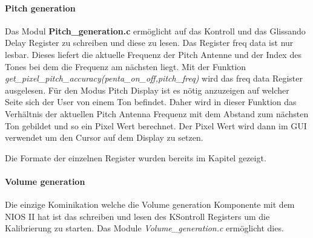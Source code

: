 \paragraph{Pitch generation}
Das Modul \textbf{Pitch\_generation.c} ermöglicht auf das Kontroll und das Glissando Delay Register zu schreiben und diese zu lesen. Das Register freq data ist nur lesbar. Dieses liefert die aktuelle Frequenz der Pitch Antenne und der Index des Tones bei dem die Frequenz am nächsten liegt. 
Mit der Funktion \textit{get\_pixel\_pitch\_accuracy(penta\_on\_off,pitch\_freq)} wird das freq data Register ausgelesen. Für den Modus Pitch Display ist es nötig anzuzeigen auf welcher Seite sich der User von einem Ton befindet. Daher wird in dieser Funktion das Verhältnis der aktuellen Pitch Antenna Frequenz mit dem Abstand zum nächsten Ton gebildet und so ein Pixel Wert berechnet. Der Pixel Wert wird dann im GUI verwendet um den Cursor auf dem Display zu setzen.

 Die Formate der einzelnen Register wurden bereits im Kapitel gezeigt.

\paragraph{Volume generation}
Die einzige Kominikation welche die Volume generation Komponente mit dem NIOS II hat ist das schreiben und lesen des KSontroll Registers um die Kalibrierung zu starten. Das Module  \textit{Volume\_generation.c} ermöglicht dies. 